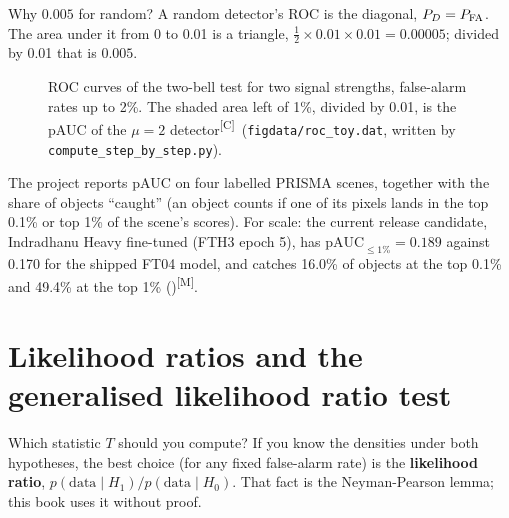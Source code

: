\documentclass[11pt,a4paper,oneside,openany]{book}
\newcommand{\meas}{\textsuperscript{\textsf{\scriptsize[M]}}}
\newcommand{\comp}{\textsuperscript{\textsf{\scriptsize[C]}}}
\begin{document}
Why $0.005$ for random? A random detector's ROC is the diagonal, $P_D=P_{\rm FA}$. The area under it from 0 to 0.01 is a triangle,
$\frac12\times0.01\times0.01=0.00005$; divided by 0.01 that is $0.005$.

\begin{figure}[ht]
\centering
{}
\caption{ROC curves of the two-bell test for two signal strengths, false-alarm rates up to 2\%. The shaded area left of 1\%,
divided by 0.01, is the pAUC of the $\mu=2$ detector\comp\ (\texttt{figdata/roc\_toy.dat}, written by \texttt{compute\_step\_by\_step.py}).}
\label{fig:roc}
\end{figure}

The project reports pAUC on four labelled PRISMA scenes, together with the share of objects ``caught'' (an object counts if one
of its pixels lands in the top 0.1\% or top 1\% of the scene's scores). For scale: the current release candidate, Indradhanu Heavy
fine-tuned (FTH3 epoch 5), has $\text{pAUC}_{\le1\%}=0.189$ against 0.170 for the shipped FT04 model, and catches 16.0\% of objects
at the top 0.1\% and 49.4\% at the top 1\% ()\meas.

\section{Likelihood ratios and the generalised likelihood ratio test}

Which statistic $T$ should you compute? If you know the densities under both hypotheses, the best choice (for any fixed false-alarm
rate) is the \textbf{likelihood ratio}, $p(\text{data}\mid H_1)/p(\text{data}\mid H_0)$. That fact is the Neyman-Pearson lemma; this
book uses it without proof.
\end{document}
